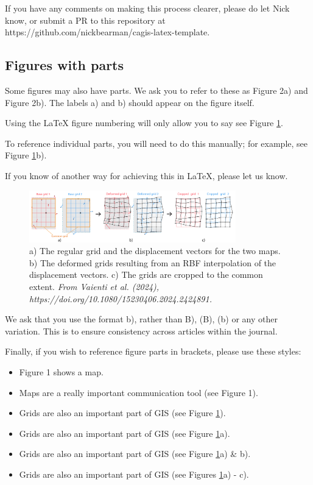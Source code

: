 \documentclass[]{interact}
\theoremstyle{plain}%
\theoremstyle{definition}
\theoremstyle{remark}
\begin{document}
If you have any comments on making this process clearer, please do let Nick know, or submit a PR to this repository at https://github.com/nickbearman/cagis-latex-template. 

\subsection{Figures with parts}

Some figures may also have parts. We ask you to refer to these as Figure 2a) and Figure 2b). The labels a) and b) should appear on the figure itself.  

Using the LaTeX figure numbering will only allow you to say see Figure \ref{fig:grids}.  

To reference individual parts, you will need to do this manually; for example, see Figure \ref{fig:grids}b). 

If you know of another way for achieving this in LaTeX, please let us know. 

\begin{figure}[h]
    \centering
    \includegraphics[width=0.8\textwidth]{Beatrice-Vaienti_Figure_03.png}
    \caption{a) The regular grid and the displacement vectors for the two maps. b) The deformed grids resulting from an RBF interpolation of the displacement vectors. c) The grids are cropped to the common extent. \textit{From Vaienti et al. (2024), https://doi.org/10.1080/15230406.2024.2424891.}}
    \label{fig:grids}
\end{figure}

We ask that you use the format b), rather than B), (B), (b) or any other variation. This is to ensure consistency across articles within the journal. 

\vspace{1\baselineskip}

Finally, if you wish to reference figure parts in brackets, please use these styles:

\begin{itemize}
  \item Figure 1 shows a map. 
  \item Maps are a really important communication tool (see Figure 1). 
  \item Grids are also an important part of GIS (see Figure \ref{fig:grids}). 
  \item Grids are also an important part of GIS (see Figure \ref{fig:grids}a).   
  \item Grids are also an important part of GIS (see Figure \ref{fig:grids}a) \& b).   
  \item Grids are also an important part of GIS (see Figures \ref{fig:grids}a) - c).   
\end{itemize}
\end{document}
